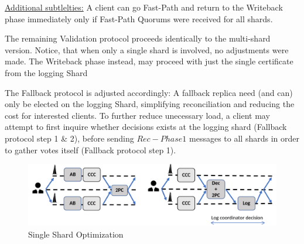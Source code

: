 \underline{Additional subtlelties:} A client can go Fast-Path and return to the Writeback phase immediately only if Fast-Path Quorums were received for all shards. 

The remaining Validation protocol proceeds identically to the multi-shard version. Notice, that when only a single shard is involved, no adjustments were made. The Writeback phase instead, may proceed with just the single certificate from the logging Shard


The Fallback protocol is adjusted accordingly: A fallback replica need (and can) only be elected on the logging Shard, simplifying reconciliation and reducing the cost for interested clients. 
To further reduce unecessary load, a client may attempt to first inquire whether decisions exists at the logging shard (Fallback protocol step 1 \& 2), before sending $Rec-Phase1$ messages to all shards in order to gather votes itself (Fallback protocol step 1). 


\begin{figure}
\begin{center}
\includegraphics[width= \textwidth]{./figures/SingleShard.png}
\end{center}
\caption{Single Shard Optimization}
\label{fig:SingleShardOpt}
\end{figure}